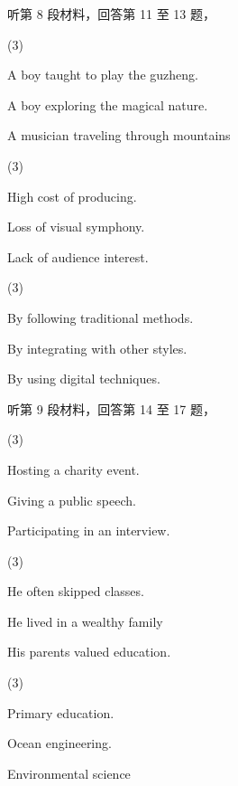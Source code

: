 \documentclass{英语试卷}
\begin{document}
\par 听第 8 段材料，回答第 11 至 13 题，\par
{}
\begin{choices}(3)
  \item A boy taught to play the guzheng.
  \item A boy exploring the magical nature.
  \item A musician traveling through mountains
\end{choices}
\begin{choices}(3)
  \item High cost of producing.
  \item Loss of visual symphony.
  \item Lack of audience interest.
\end{choices}
\begin{choices}(3)
  \item By following traditional methods.
  \item By integrating with other styles.
  \item By using digital techniques.
\end{choices}
\par 听第 9 段材料，回答第 14 至 17 题，\par
{}
\begin{choices}(3)
  \item Hosting a charity event.
  \item Giving a public speech.
  \item Participating in an interview.
\end{choices}
\begin{choices}(3)
  \item He often skipped classes.
  \item He lived in a wealthy family
  \item His parents valued education.
\end{choices}
\begin{choices}(3)
  \item Primary education.
  \item Ocean engineering.
  \item Environmental science
\end{choices}
\end{document}
